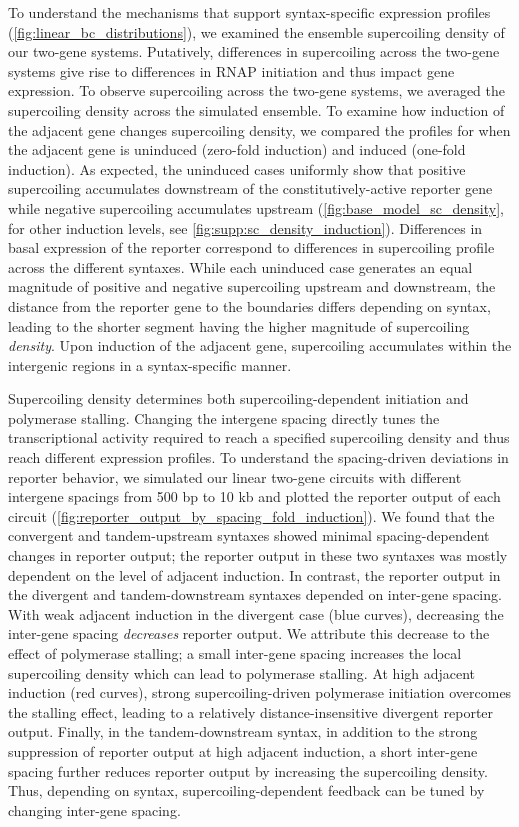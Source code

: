 \documentclass[11pt]{article}
\begin{document}
To understand the mechanisms that support syntax-specific expression profiles (\cref{fig:linear_bc_distributions}), we examined the ensemble supercoiling density of our two-gene systems. Putatively, differences in supercoiling across the two-gene systems give rise to differences in RNAP initiation and thus impact gene expression. To observe supercoiling across the two-gene systems, we averaged the supercoiling density across the simulated ensemble. To examine how induction of the adjacent gene changes supercoiling density, we compared the profiles for when the adjacent gene is uninduced (zero-fold induction) and induced (one-fold induction). As expected, the uninduced cases uniformly show that positive supercoiling accumulates downstream of the constitutively-active reporter gene while negative supercoiling accumulates upstream (\cref{fig:base_model_sc_density}, for other induction levels, see \cref{fig:supp:sc_density_induction}). Differences in basal expression of the reporter correspond to differences in supercoiling profile across the different syntaxes. While each uninduced case generates an equal magnitude of positive and negative supercoiling upstream and downstream, the distance from the reporter gene to the boundaries differs depending on syntax, leading to the shorter segment having the higher magnitude of supercoiling \emph{density}. Upon induction of the adjacent gene, supercoiling accumulates within the intergenic regions in a syntax-specific manner.

Supercoiling density determines both supercoiling-dependent initiation and polymerase stalling. Changing the intergene spacing directly tunes the transcriptional activity required to reach a specified supercoiling density and thus reach different expression profiles. To understand the spacing-driven deviations in reporter behavior, we simulated our linear two-gene circuits with different intergene spacings from 500 bp to 10 kb and plotted the reporter output of each circuit (\cref{fig:reporter_output_by_spacing_fold_induction}). We found that the convergent and tandem-upstream syntaxes showed minimal spacing-dependent changes in reporter output; the reporter output in these two syntaxes was mostly dependent on the level of adjacent induction. In contrast, the reporter output in the divergent and tandem-downstream syntaxes depended on inter-gene spacing. With weak adjacent induction in the divergent case (blue curves), decreasing the inter-gene spacing \emph{decreases} reporter output. We attribute this decrease to the effect of polymerase stalling; a small inter-gene spacing increases the local supercoiling density which can lead to polymerase stalling. At high adjacent induction (red curves), strong supercoiling-driven polymerase initiation overcomes the stalling effect, leading to a relatively distance-insensitive divergent reporter output. Finally, in the tandem-downstream syntax, in addition to the strong suppression of reporter output at high adjacent induction, a short inter-gene spacing further reduces reporter output by increasing the supercoiling density. Thus, depending on syntax, supercoiling-dependent feedback can be tuned by changing inter-gene spacing.
\end{document}
